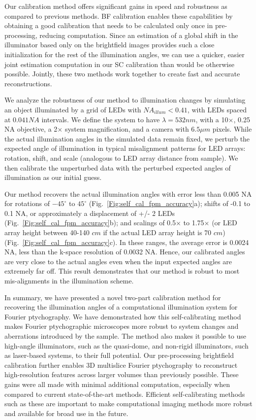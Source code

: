 Our calibration method offers significant gains in speed and robustness as compared to previous methods. BF calibration enables these capabilities by obtaining a good calibration that needs to be calculated only once in pre-processing, reducing computation. Since an estimation of a global shift in the illuminator based only on the brightfield images provides such a close initialization for the rest of the illumination angles, we can use a quicker, easier joint estimation computation in our SC calibration than would be otherwise possible. Jointly, these two methods work together to create fast and accurate reconstructions.

We analyze the robustness of our method to illumination changes by simulating an object illuminated by a grid of LEDs with $NA_{illum}<0.41$, with LEDs spaced at $0.041 NA$ intervals. We define the system to have $\lambda = 532 nm$, with a 10$\times$, 0.25 NA objective, a 2$\times$ system magnification, and a camera with $6.5 {\mu}m$ pixels. While the actual illumination angles in the simulated data remain fixed, we perturb the expected angle of illumination in typical misalignment patterns for LED arrays: rotation, shift, and scale (analogous to LED array distance from sample). We then calibrate the unperturbed data with the perturbed expected angles of illumination as our initial guess.

Our method recovers the actual illumination angles with error less than 0.005 NA for rotations of $-45^{\circ}$ to $45^{\circ}$ (Fig.~\ref{Fig:self_cal_fpm_accuracy}a); shifts of -0.1 to 0.1 NA, or approximately a displacement of +/- 2 LEDs (Fig.~\ref{Fig:self_cal_fpm_accuracy}b); and scalings of 0.5$\times$ to 1.75$\times$ (or LED array height between 40-140 $cm$ if the actual LED array height is 70 $cm$) (Fig.~\ref{Fig:self_cal_fpm_accuracy}c). In these ranges, the average error is 0.0024 NA, less than the k-space resolution of 0.0032 NA. Hence, our calibrated angles are very close to the actual angles even when the input expected angles are extremely far off. This result demonstrates that our method is robust to most mis-alignments in the illumination scheme.

In summary, we have presented a novel two-part calibration method for recovering the illumination angles of a computational illumination system for Fourier ptychography. We have demonstrated how this self-calibrating method makes Fourier ptychographic microscopes more robust to system changes and aberrations introduced by the sample. The method also makes it possible to use high-angle illuminators, such as the quasi-dome, and non-rigid illuminators, such as laser-based systems, to their full potential. Our pre-processing brightfield calibration further enables 3D multislice Fourier ptychography to reconstruct high-resolution features across larger volumes than previously possible. These gains were all made with minimal additional computation, especially when compared to current state-of-the-art methods. Efficient self-calibrating methods such as these are important to make computational imaging methods more robust and available for broad use in the future.

